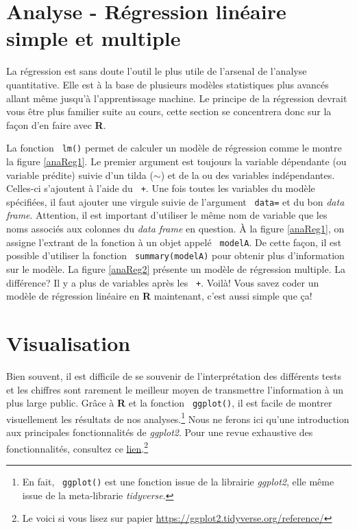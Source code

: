 \documentclass[10.5pt,a4paper]{article}
\newcommand{\rcode}[1]{\texttt{\color{rstudio} #1}}
\begin{document}
  
  \section{Analyse - Régression linéaire simple et multiple}
  La régression est sans doute l'outil le plus utile de l'arsenal de l'analyse quantitative. Elle est à la base de plusieurs modèles statistiques plus avancés allant même jusqu'à l'apprentissage machine. Le principe de la régression devrait vous être plus familier suite au cours, cette section se concentrera donc sur la façon d'en faire avec \textbf{R}.

  La fonction \rcode{lm()} permet de calculer un modèle de régression comme le montre la figure \ref{anaReg1}. Le premier argument est toujours la variable dépendante (ou variable prédite) suivie d'un tilda ($\sim$) et de la ou des variables indépendantes. Celles-ci s'ajoutent à l'aide du \rcode{+}. Une fois toutes les variables du modèle spécifiées, il faut ajouter une virgule suivie de l'argument \rcode{data=} et du bon \textit{data frame}. Attention, il est important d'utiliser le même nom de variable que les noms associés aux colonnes du \textit{data frame} en question. À la figure \ref{anaReg1}, on assigne l'extrant de la fonction à un objet appelé \rcode{modelA}. De cette façon, il est possible d'utiliser la fonction \rcode{summary(modelA)} pour obtenir plus d'information sur le modèle. La figure \ref{anaReg2} présente un modèle de régression multiple. La différence? Il y a plus de variables après les \rcode{+}. Voilà! Vous savez coder un modèle de régression linéaire en \textbf{R} maintenant, c'est aussi simple que ça!  
  
  \section{Visualisation}
  Bien souvent, il est difficile de se souvenir de l'interprétation des différents tests et les chiffres sont rarement le meilleur moyen de transmettre l'information à un plus large public. Grâce à \textbf{R} et la fonction \rcode{ggplot()}, il est facile de montrer visuellement les résultats de nos analyses.\footnote{En fait, \rcode{ggplot()} est une fonction issue de la librairie \textit{ggplot2}, elle même issue de la meta-librarie \textit{tidyverse}.} Nous ne ferons ici qu'une introduction aux principales fonctionnalités de \textit{ggplot2}. Pour une revue exhaustive des fonctionnalités, consultez ce \href{https://ggplot2.tidyverse.org/reference/}{lien}.\footnote{Le voici si vous lisez sur papier \href{https://ggplot2.tidyverse.org/reference/}{https://ggplot2.tidyverse.org/reference/}}
  
\end{document}
